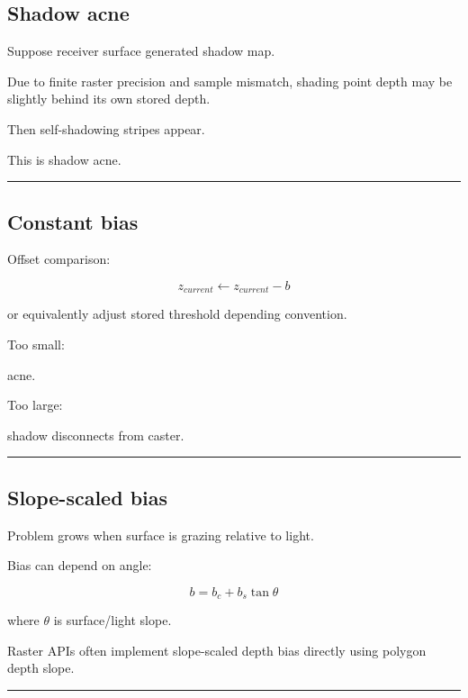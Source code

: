 \subsection{Shadow acne}\label{04-visual-computing-ii-ch040-shadow-acne}

Suppose receiver surface generated shadow map.

Due to finite raster precision and sample mismatch, shading point depth may be slightly behind its own stored depth.

Then self-shadowing stripes appear.

This is shadow acne.

\begin{center}\rule{0.5\linewidth}{0.5pt}\end{center}

\subsection{Constant bias}\label{04-visual-computing-ii-ch040-constant-bias}

Offset comparison:

\[
z_{current}
\leftarrow
z_{current}-b
\]

or equivalently adjust stored threshold depending convention.

Too small:

acne.

Too large:

shadow disconnects from caster.

\begin{center}\rule{0.5\linewidth}{0.5pt}\end{center}

\subsection{Slope-scaled bias}\label{04-visual-computing-ii-ch040-slope-scaled-bias}

Problem grows when surface is grazing relative to light.

Bias can depend on angle:

\[
\boxed{
b=
b_c+
b_s\tan\theta
}
\]

where \(\theta\) is surface/light slope.

Raster APIs often implement slope-scaled depth bias directly using polygon depth slope.

\begin{center}\rule{0.5\linewidth}{0.5pt}\end{center}

